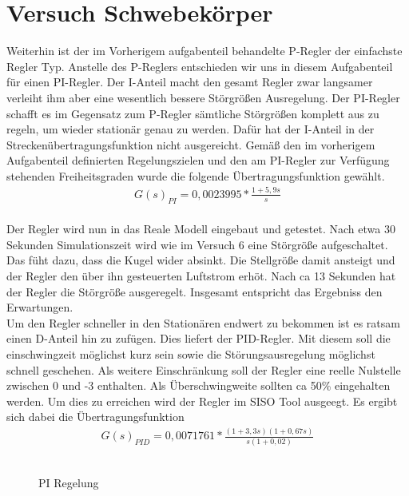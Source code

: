 \documentclass[10pt]{scrartcl}
\begin{document}
\section{Versuch Schwebekörper}
Weiterhin ist der im Vorherigem aufgabenteil behandelte P-Regler der einfachste Regler Typ. Anstelle des P-Reglers entschieden wir uns in diesem Aufgabenteil für einen PI-Regler. Der I-Anteil macht den gesamt Regler zwar langsamer verleiht ihm aber eine wesentlich bessere Störgrößen Ausregelung. Der PI-Regler schafft es im Gegensatz zum P-Regler sämtliche Störgrößen komplett aus zu regeln, um wieder stationär genau zu werden. Dafür hat der I-Anteil in der Streckenübertragungsfunktion nicht ausgereicht. Gemäß den im vorherigem Aufgabenteil definierten Regelungszielen und den am PI-Regler zur Verfügung stehenden Freiheitsgraden wurde die folgende Übertragungsfunktion gewählt. 
\begin{align}
   G(s)_{PI}=0,0023995*\frac{1+5,9s}{s}
\end{align} \\
Der Regler wird nun in das Reale Modell eingebaut und getestet.
Nach etwa 30 Sekunden Simulationszeit wird wie im Versuch 6 eine Störgröße aufgeschaltet. Das füht dazu, dass die Kugel wider absinkt. Die Stellgröße damit ansteigt und der Regler den über ihn gesteuerten Luftstrom erhöt. Nach ca 13 Sekunden hat der Regler die Störgröße ausgeregelt. Insgesamt entspricht das Ergebniss den Erwartungen.\\
Um den Regler schneller in den Stationären endwert zu bekommen ist es ratsam einen D-Anteil hin zu zufügen. Dies liefert der PID-Regler.
Mit diesem soll die einschwingzeit möglichst kurz sein sowie die Störungsausregelung möglichst schnell geschehen. Als weitere Einschränkung soll der Regler eine reelle Nulstelle zwischen 0 und -3 enthalten. Als Überschwingweite sollten ca 50\% eingehalten werden.
Um dies zu erreichen wird der Regler im SISO Tool ausgeegt.
Es ergibt sich dabei die Übertragungsfunktion
\begin{align}
   G(s)_{PID}=0,0071761*\frac{(1+3,3s)(1+0,67s)}{s(1+0,02)}
\end{align} \\
\begin{figure} [H]
\begin{center}
\caption{PI Regelung } 
\end{center}
\end{figure}
\end{document}
